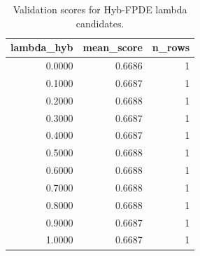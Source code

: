 \begin{table}[t]
\caption{Validation scores for Hyb-FPDE lambda candidates.}
\label{tab:lambda_distribution_computed}
\centering
\begin{tabular}{rrr}
\toprule
lambda\_hyb & mean\_score & n\_rows \\
\midrule
0.0000 & 0.6686 & 1 \\
0.1000 & 0.6687 & 1 \\
0.2000 & 0.6688 & 1 \\
0.3000 & 0.6687 & 1 \\
0.4000 & 0.6687 & 1 \\
0.5000 & 0.6688 & 1 \\
0.6000 & 0.6688 & 1 \\
0.7000 & 0.6688 & 1 \\
0.8000 & 0.6688 & 1 \\
0.9000 & 0.6687 & 1 \\
1.0000 & 0.6687 & 1 \\
\bottomrule
\end{tabular}

\end{table}
